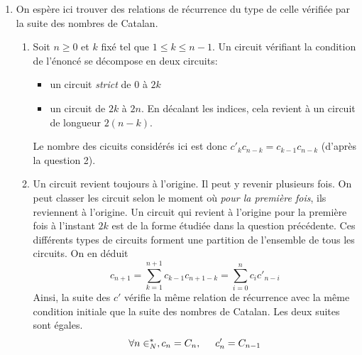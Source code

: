 \begin{enumerate}
  \item On espère ici trouver des relations de récurrence du type de celle vérifiée par la suite des nombres de Catalan.
\begin{enumerate}
  \item Soit $n\geq0$ et $k$ fixé tel que $1\leq k\leq n-1$. Un circuit vérifiant la condition de l'énoncé se décompose en deux circuits:
\begin{itemize}
  \item un circuit \emph{strict} de $0$ à $2k$
  \item un circuit de $2k$ à $2n$. En décalant les indices, cela revient à un circuit de longueur $2(n-k)$.
\end{itemize}
Le nombre des cicuits considérés ici est donc $c'_{k}c_{n-k} = c_{k-1}c_{n-k}$ (d'après la question 2).
  \item Un circuit revient toujours à l'origine. Il peut y revenir plusieurs fois. On peut classer les circuit selon le moment où \emph{pour la première fois}, ils reviennent à l'origine. Un circuit qui revient à l'origine pour la première fois à l'instant $2k$ est de la forme étudiée dans la question précédente. Ces différents types de circuits forment une partition de l'ensemble de tous les circuits. On en déduit
\begin{displaymath}
  c_{n+1} = \sum_{k=1}^{n+1}c_{k-1} c_{n+1-k} = \sum_{i=0}^n c_i c'_{n-i}
\end{displaymath}
Ainsi, la suite des $c'$ vérifie la même relation de récurrence avec la même condition initiale que la suite des nombres de Catalan. Les deux suites sont égales.
\begin{displaymath}
\forall n\in _N^*, c_n = C_n,\hspace{0.5cm} c'_n = C_{n-1}  
\end{displaymath}

\end{enumerate}

\end{enumerate}

